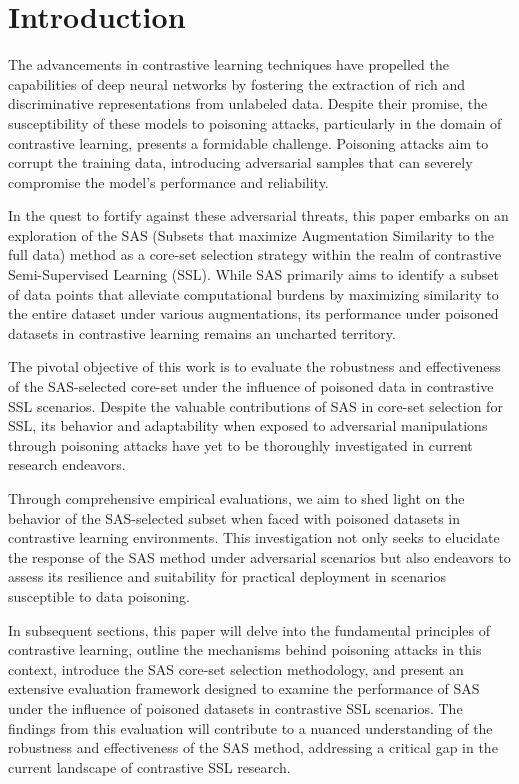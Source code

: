 \section{Introduction}

The advancements in contrastive learning techniques have propelled the capabilities of deep neural networks by fostering the extraction of rich and discriminative representations from unlabeled data. Despite their promise, the susceptibility of these models to poisoning attacks, particularly in the domain of contrastive learning, presents a formidable challenge. Poisoning attacks aim to corrupt the training data, introducing adversarial samples that can severely compromise the model's performance and reliability.

In the quest to fortify against these adversarial threats, this paper embarks on an exploration of the SAS (Subsets that maximize Augmentation Similarity to the full data) method as a core-set selection strategy within the realm of contrastive Semi-Supervised Learning (SSL). While SAS primarily aims to identify a subset of data points that alleviate computational burdens by maximizing similarity to the entire dataset under various augmentations, its performance under poisoned datasets in contrastive learning remains an uncharted territory.

The pivotal objective of this work is to evaluate the robustness and effectiveness of the SAS-selected core-set under the influence of poisoned data in contrastive SSL scenarios. Despite the valuable contributions of SAS in core-set selection for SSL, its behavior and adaptability when exposed to adversarial manipulations through poisoning attacks have yet to be thoroughly investigated in current research endeavors.

Through comprehensive empirical evaluations, we aim to shed light on the behavior of the SAS-selected subset when faced with poisoned datasets in contrastive learning environments. This investigation not only seeks to elucidate the response of the SAS method under adversarial scenarios but also endeavors to assess its resilience and suitability for practical deployment in scenarios susceptible to data poisoning.

In subsequent sections, this paper will delve into the fundamental principles of contrastive learning, outline the mechanisms behind poisoning attacks in this context, introduce the SAS core-set selection methodology, and present an extensive evaluation framework designed to examine the performance of SAS under the influence of poisoned datasets in contrastive SSL scenarios. The findings from this evaluation will contribute to a nuanced understanding of the robustness and effectiveness of the SAS method, addressing a critical gap in the current landscape of contrastive SSL research.